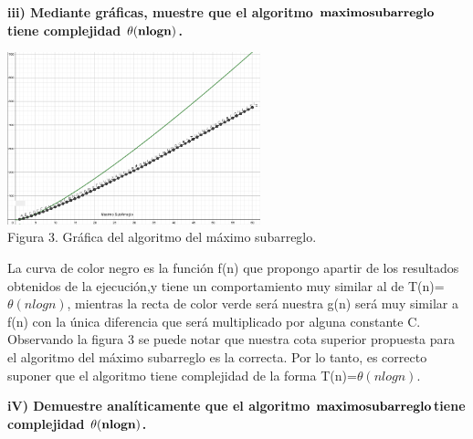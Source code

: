 \documentclass[spanish]{article}
\begin{document}
	\bigskip
\newpage

	{\large{\bf iii) Mediante gráficas, muestre que el algoritmo  ${\bf maximo subarreglo }$ tiene complejidad ${\bf \theta(nlogn)}$.}}\\
	
	\bigskip
	
	\begin{center}
		\includegraphics[width=0.55\textwidth]{./imagenes/ms.png}\\
		Figura 3. Gráfica del algoritmo del máximo subarreglo.\\
	\end{center}

	\bigskip

La curva de color negro es la función f(n) que propongo apartir de los resultados obtenidos de la ejecución,y tiene un comportamiento muy similar al de T(n)=${\theta(nlogn)}$, mientras la recta de color verde será nuestra g(n) será muy similar a f(n) con la única diferencia que será multiplicado por alguna constante C. Observando la figura 3 se puede notar que  nuestra cota superior propuesta para el algoritmo del máximo subarreglo es la correcta. Por lo tanto, es correcto suponer que el algoritmo tiene complejidad de la forma T(n)=${\theta(nlogn)}$.\\

	\bigskip
\newpage

	{\large{\bf iV) Demuestre  analíticamente que el algoritmo  ${\bf maximo subarreglo }$tiene complejidad ${\bf \theta(nlogn)}$.}}
	
	\bigskip
	
\end{document}
